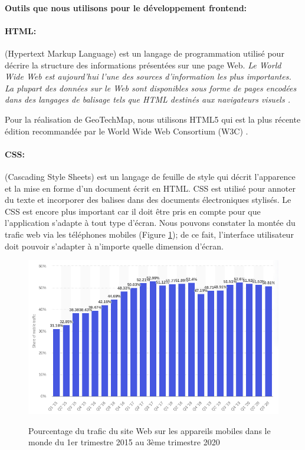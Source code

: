         \paragraph{Outils que nous utilisons pour le développement frontend:}
        \paragraph{HTML: }
        (Hypertext Markup Language) est un langage de programmation utilisé pour décrire 
        la structure des informations présentées sur une page Web. 
        \textit{Le World Wide Web est aujourd'hui l'une des sources d'information les plus 
        importantes. La plupart des données sur le Web sont disponibles sous forme de 
        pages encodées dans des langages de balisage tels que HTML destinés aux 
        navigateurs visuels \cite{yang2003html}.} 
        \par 
        Pour la réalisation de GeoTechMap, nous utilisons HTML5 qui est la plus récente
        édition recommandée par le World Wide Web Consortium (W3C) \cite{brooks2010world}.
        \paragraph{CSS: }
         (Cascading Style Sheets) est un langage de feuille de style qui décrit 
        l'apparence et la mise en forme d'un document écrit en HTML. CSS est utilisé 
        pour annoter du texte et incorporer des balises dans des documents électroniques stylisés.
        Le CSS est encore plus important car il doit être pris en compte pour que l'application s'adapte à tout 
        type d'écran. Nous pouvons constater la montée du trafic web via les téléphones mobiles (Figure \ref{fig:statMobile});
        de ce fait, l'interface utilisateur doit pouvoir s'adapter à n'importe quelle dimension d'écran.
        \begin{figure}[t]
                \centering
                \includegraphics[scale=0.5]{images/Implementation/statMobile.png}
                \caption{
                        Pourcentage du trafic du site Web sur les appareils 
                        mobiles dans le monde du 1er trimestre 2015 au 3ème trimestre 2020 }\cite{linkstatmobile}
                \label{fig:statMobile}
        \end{figure}
